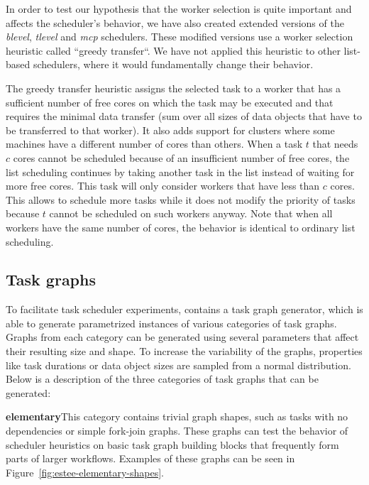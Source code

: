 In order to test our hypothesis that the worker selection is quite important and affects the
scheduler's behavior, we have also created extended versions of the \emph{blevel},
\emph{tlevel} and \emph{mcp} schedulers. These modified versions use a worker selection heuristic
called ``greedy transfer``. We have not applied this heuristic to other list-based schedulers, where
it would fundamentally change their behavior.

The greedy transfer heuristic assigns the selected task to a worker that has a sufficient number of
free cores on which the task may be executed and that requires the minimal data transfer (sum over all
sizes of data objects that have to be transferred to that worker). It also adds support for clusters
where some machines have a different number of cores than others. When a task $t$ that needs $c$ cores cannot be scheduled
because of an insufficient number of free cores, the list scheduling continues
by taking another task in the list instead of waiting for more free cores. This
task will only consider workers that have less than $c$ cores. This allows to
schedule more tasks while it does not modify the priority of tasks because $t$
cannot be scheduled on such workers anyway. Note that when all workers have the
same number of cores, the behavior is identical to ordinary list scheduling.

\subsection{Task graphs}
To facilitate task scheduler experiments, \estee{} contains a task graph generator, which is able to
generate parametrized instances of various categories of task graphs. Graphs from each category can
be generated using several parameters that affect their resulting size and shape. To increase the
variability of the graphs, properties like task durations or data object sizes are sampled from
a normal distribution. Below is a description of the three categories of task graphs that can be
generated:

\vspace{1mm}\noindent\textbf{elementary}\quad This category contains trivial graph shapes, such as tasks
with no dependencies or simple fork-join graphs. These graphs can test the behavior of scheduler
heuristics on basic task graph building blocks that frequently form parts of larger workflows. Examples
of these graphs can be seen in Figure~\ref{fig:estee-elementary-shapes}.

